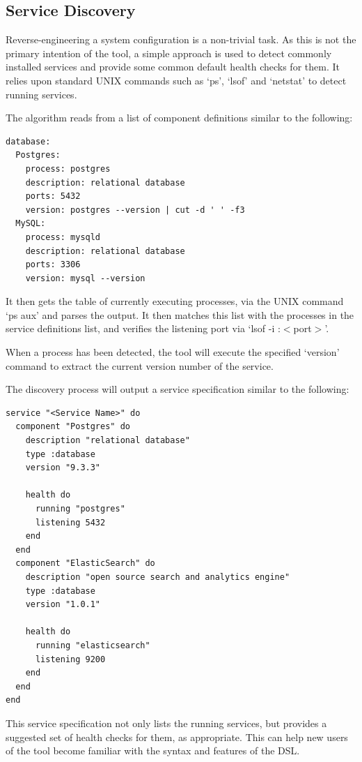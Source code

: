 \documentclass{cshonours}
\begin{document}
\pagebreak
\subsection{Service Discovery}

Reverse-engineering a system configuration is a non-trivial task. As this is not the primary intention of the tool, a simple approach is used to detect commonly installed services and provide some common default health checks for them. It relies upon standard UNIX commands such as `ps', `lsof' and `netstat' to detect running services.

The algorithm reads from a list of component definitions similar to the following:

\begin{verbatim}
database:
  Postgres:
    process: postgres
    description: relational database
    ports: 5432
    version: postgres --version | cut -d ' ' -f3
  MySQL:
    process: mysqld
    description: relational database
    ports: 3306
    version: mysql --version
\end{verbatim}

It then gets the table of currently executing processes, via the UNIX command `ps aux' and parses the output. It then matches this list with the processes in the service definitions list, and verifies the listening port via `lsof -i :$<$port$>$'.

When a process has been detected, the tool will execute the specified `version' command to extract the current version number of the service.

\pagebreak
The discovery process will output a service specification similar to the following:

\begin{verbatim}
service "<Service Name>" do
  component "Postgres" do
    description "relational database"
    type :database
    version "9.3.3"

    health do
      running "postgres"
      listening 5432
    end
  end
  component "ElasticSearch" do
    description "open source search and analytics engine"
    type :database
    version "1.0.1"

    health do
      running "elasticsearch"
      listening 9200
    end
  end
end
\end{verbatim}

This service specification not only lists the running services, but provides a suggested set of health checks for them, as appropriate. This can help new users of the tool become familiar with the syntax and features of the DSL.
\end{document}
